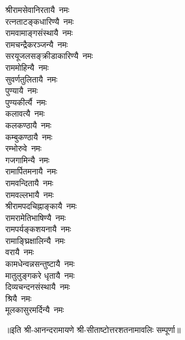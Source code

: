 \begin{multicols}{2}
\begin{flushleft}
श्रीरामसेवानिरतायै~नमः\\
रत्नताटङ्कधारिण्यै~नमः\\
रामवामाङ्गसंस्थायै~नमः\\
रामचन्द्रैकरञ्जन्यै~नमः\\
सरयूजलसङ्क्रीडाकारिण्यै~नमः\\
राममोहिन्यै~नमः\hfill{}\\
सुवर्णतुलितायै~नमः\\
पुण्यायै~नमः\\
पुण्यकीर्त्यै~नमः\\
कलावत्यै~नमः\\
कलकण्ठायै~नमः\\
कम्बुकण्ठायै~नमः\\
रम्भोरुवे~नमः\\
गजगामिन्यै~नमः\\
रामार्पितमनायै~नमः\\
रामवन्दितायै~नमः\hfill{}\\
रामवल्लभायै~नमः\\
श्रीरामपदचिह्नाङ्कायै~नमः\\
रामरामेतिभाषिण्यै~नमः\\
रामपर्यङ्कशयनायै~नमः\\
रामाङ्घ्रिक्षालिन्यै~नमः\\
वरायै~नमः\\
कामधेन्वन्नसन्तुष्टायै~नमः\\
मातुलुङ्गकरे धृतायै~नमः\\
दिव्यचन्दनसंस्थायै~नमः\\
श्रियै~नमः\hfill{}\\
मूलकासुरमर्दिन्यै~नमः\\
\end{flushleft}
\end{multicols}
॥इति श्री-आनन्दरामायणे श्री-सीताष्टोत्तरशतनामावलिः सम्पूर्णा॥
